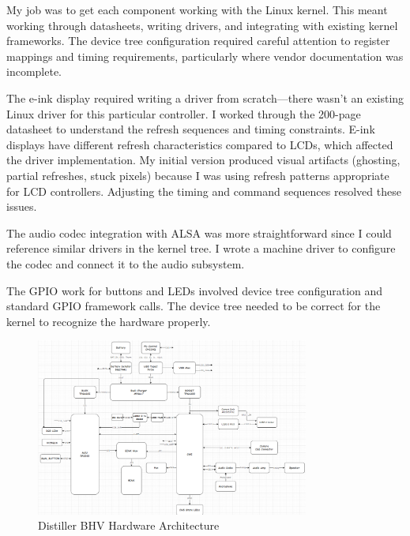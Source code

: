 \documentclass[12pt,a4paper]{report}
\begin{document}
\vspace{0.3cm}

My job was to get each component working with the Linux kernel. This meant working through datasheets, writing drivers, and integrating with existing kernel frameworks. The device tree configuration required careful attention to register mappings and timing requirements, particularly where vendor documentation was incomplete.

\vspace{0.3cm}

The e-ink display required writing a driver from scratch—there wasn't an existing Linux driver for this particular controller. I worked through the 200-page datasheet to understand the refresh sequences and timing constraints. E-ink displays have different refresh characteristics compared to LCDs, which affected the driver implementation. My initial version produced visual artifacts (ghosting, partial refreshes, stuck pixels) because I was using refresh patterns appropriate for LCD controllers. Adjusting the timing and command sequences resolved these issues.

\vspace{0.3cm}

The audio codec integration with ALSA was more straightforward since I could reference similar drivers in the kernel tree. I wrote a machine driver to configure the codec and connect it to the audio subsystem.

\vspace{0.3cm}

The GPIO work for buttons and LEDs involved device tree configuration and standard GPIO framework calls. The device tree needed to be correct for the kernel to recognize the hardware properly.

\begin{figure}[htbp]
    \centering
    \includegraphics[width=0.8\textwidth]{bhv_hardware_architecture.png}
    \caption{Distiller BHV Hardware Architecture}
\end{figure}
\end{document}
